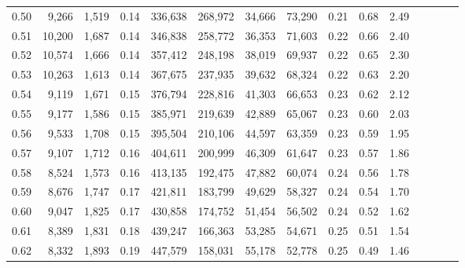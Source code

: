 \begin{tabular}{rrrcrrrrrrrrrrr}
0.50 &   9,266 &  1,519 &                                       0.14 &  336,638 &  268,972 &   34,666 &   73,290 &  0.21 &  0.68 &                         2.49 \\
0.51 &  10,200 &  1,687 &                                       0.14 &  346,838 &  258,772 &   36,353 &   71,603 &  0.22 &  0.66 &                         2.40 \\
0.52 &  10,574 &  1,666 &                                       0.14 &  357,412 &  248,198 &   38,019 &   69,937 &  0.22 &  0.65 &                         2.30 \\
0.53 &  10,263 &  1,613 &                                       0.14 &  367,675 &  237,935 &   39,632 &   68,324 &  0.22 &  0.63 &                         2.20 \\
0.54 &   9,119 &  1,671 &                                       0.15 &  376,794 &  228,816 &   41,303 &   66,653 &  0.23 &  0.62 &                         2.12 \\
0.55 &   9,177 &  1,586 &                                       0.15 &  385,971 &  219,639 &   42,889 &   65,067 &  0.23 &  0.60 &                         2.03 \\
0.56 &   9,533 &  1,708 &                                       0.15 &  395,504 &  210,106 &   44,597 &   63,359 &  0.23 &  0.59 &                         1.95 \\
0.57 &   9,107 &  1,712 &                                       0.16 &  404,611 &  200,999 &   46,309 &   61,647 &  0.23 &  0.57 &                         1.86 \\
0.58 &   8,524 &  1,573 &                                       0.16 &  413,135 &  192,475 &   47,882 &   60,074 &  0.24 &  0.56 &                         1.78 \\
0.59 &   8,676 &  1,747 &                                       0.17 &  421,811 &  183,799 &   49,629 &   58,327 &  0.24 &  0.54 &                         1.70 \\
0.60 &   9,047 &  1,825 &                                       0.17 &  430,858 &  174,752 &   51,454 &   56,502 &  0.24 &  0.52 &                         1.62 \\
0.61 &   8,389 &  1,831 &                                       0.18 &  439,247 &  166,363 &   53,285 &   54,671 &  0.25 &  0.51 &                         1.54 \\
0.62 &   8,332 &  1,893 &                                       0.19 &  447,579 &  158,031 &   55,178 &   52,778 &  0.25 &  0.49 &                         1.46 \\

\end{tabular}
